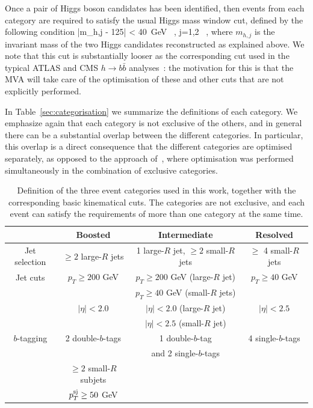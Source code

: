 Once a pair of Higgs boson candidates has been identified,
then events from each category are required to satisfy the usual
Higgs mass window cut, defined by
the following condition
\be
\label{higgsmasswindow}
|m_{h,j} - 125| < 40~{\rm GeV} \, , j=1,2 \, ,
\ee
where $m_{h,j}$ is the invariant mass of the two Higgs candidates
reconstructed as explained above.
%
We note that this cut is substantially looser as the corresponding
cut used in the typical ATLAS and CMS $h\to b\bar{b}$
analyses~\cite{Aad:2012gxa,Chatrchyan:2013zna}: the motivation
for this is that the MVA will take care of the optimisation of these
and other cuts that are not explicitly performed.


In Table~\ref{sec:categorisation} we summarize the definitions of each
category.
%
We emphasize again that each category is not exclusive of the others,
and in general there can be a substantial overlap
between the different categories.
%
In particular, this overlap is a direct consequence that
the different categories are optimised separately, as opposed
to the approach of~\cite{Gouzevitch:2013qca}, where optimisation
was performed simultaneously in the combination of exclusive categories.


\begin{table}[h]
  \centering
  \small
  \begin{tabular}{c|c|c|c}
    \hline
    &  Boosted  &  Intermediate  &  Resolved  \\
    \hline
    \hline 
    Jet selection  &  $\ge 2$ large-$R$ jets  & 1 large-$R$ jet, $\ge 2$ small-$R$
    jets  &  $\ge$ 4 small-$R$ jets \\
    \hline
    Jet cuts  & $p_T \ge 200$ GeV   &  $p_T \ge 200$ GeV (large-$R$ jet)
    &  $p_T \ge 40$ GeV \\
    &  & $p_T \ge 40$ GeV (small-$R$ jets)   &    \\
    &   $|\eta|<2.0$  & $|\eta|<2.0$ (large-$R$ jet) & $|\eta|<2.5$ \\
    &        & $|\eta|<2.5$ (small-$R$ jet)  &  \\
    \hline
    $b$-tagging  & 2 double-$b$-tags  & 1 double-$b$-tag & 4 single-$b$-tags \\
    &  & and 2 single-$b$-tags  &  \\
       & $\ge 2$ small-$R$ subjets  & &  \\
    &  $p_T^{\rm sj}\ge 50$ GeV &   &  \\
    \hline
    \end{tabular}
  \caption{\small Definition of the three event categories used in this
    work, together with the corresponding basic kinematical cuts.
    The categories are not exclusive, and each event can satisfy the
    requirements of more than one category at the same time.  
\label{sec:categorisationTable}
  }
\end{table}


